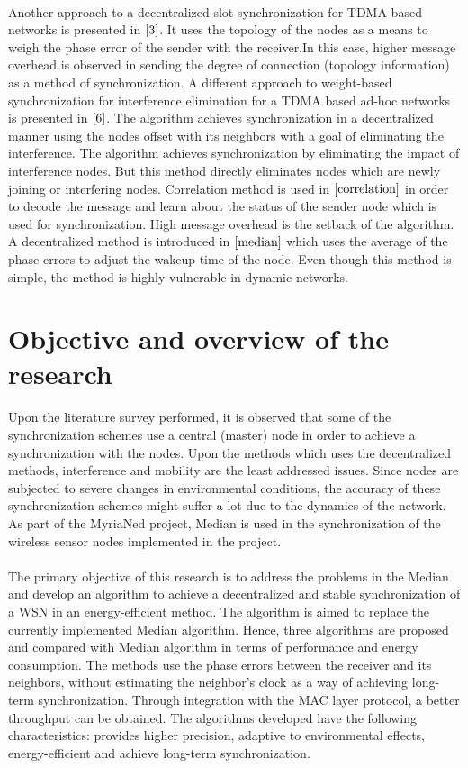 \documentclass[a4paper,10pt]{report}
\begin{document}
\paragraph*{}
Another approach to a decentralized slot synchronization for
TDMA-based networks is presented in $\cite{3}$. It uses the topology
of the nodes as a means to weigh the phase error of the sender with
the receiver.In this case, higher message overhead is observed in
sending the degree of connection (topology information) as a method
of synchronization. A different approach to weight-based
synchronization for interference elimination for a TDMA based ad-hoc
networks is presented in $\cite{6}$. The algorithm achieves
synchronization in a decentralized manner using the nodes offset
with its neighbors with a goal of eliminating the interference. The
algorithm achieves synchronization by eliminating the impact of
interference nodes. But this method directly eliminates nodes which
are newly joining or interfering nodes. Correlation method is used
in $\cite{correlation}$ in order to decode the message and learn
about the status of the sender node which is used for
synchronization. High message overhead is the setback of the
algorithm. A decentralized method is introduced in $\cite{median}$
which uses the average of the phase errors to adjust the wakeup time
of the node. Even though this method is simple, the method is highly
vulnerable in dynamic networks.
\section{\textbf{Objective and overview of the research}}
Upon the literature survey performed, it is observed that some of
the synchronization schemes use a central (master) node in order to
achieve a synchronization with the nodes. Upon the methods which
uses the decentralized methods, interference and mobility are the
least addressed issues. Since nodes are subjected to severe changes
in environmental conditions, the accuracy of these synchronization
schemes might suffer a lot due to the dynamics of the network. As
part of the MyriaNed project, Median is used in the synchronization
of the wireless sensor nodes implemented in the project.
\paragraph*{}
The primary objective of this research is to address the problems in
the Median and develop an algorithm to achieve a decentralized and
stable synchronization of a WSN in an energy-efficient method. The
algorithm is aimed to replace the currently implemented Median
algorithm. Hence, three algorithms are proposed and compared with
Median algorithm in terms of performance and energy consumption. The
methods use the phase errors between the receiver and its neighbors,
without estimating the neighbor's clock as a way of achieving
long-term synchronization. Through integration with the MAC layer
protocol, a better throughput can be obtained. The algorithms
developed have the following characteristics: provides higher
precision, adaptive to environmental effects, energy-efficient and
achieve long-term synchronization.
\end{document}
